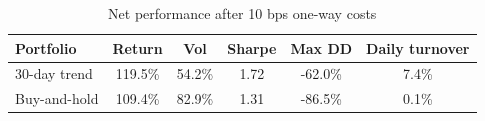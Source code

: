 \begin{table}[H]
\centering
\caption{Net performance after 10 bps one-way costs}
\begin{tabular}{lccccc}
\toprule
Portfolio & Return & Vol & Sharpe & Max DD & Daily turnover \\
\midrule
30-day trend & 119.5\% & 54.2\% & 1.72 & -62.0\% & 7.4\% \\
Buy-and-hold & 109.4\% & 82.9\% & 1.31 & -86.5\% & 0.1\% \\
\bottomrule
\end{tabular}
\end{table}
